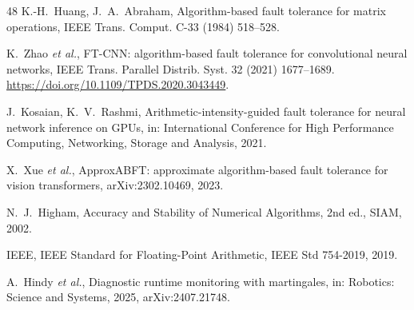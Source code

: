 \documentclass[preprint,12pt]{elsarticle}
\begin{document}
\begin{thebibliography}{48}
 K.-H.~Huang, J.~A.~Abraham, Algorithm-based fault tolerance for matrix operations, IEEE Trans. Comput. C-33 (1984) 518--528.

 K.~Zhao \textit{et al.}, FT-CNN: algorithm-based fault tolerance for convolutional neural networks, IEEE Trans. Parallel Distrib. Syst. 32 (2021) 1677--1689. \url{https://doi.org/10.1109/TPDS.2020.3043449}.

 J.~Kosaian, K.~V.~Rashmi, Arithmetic-intensity-guided fault tolerance for neural network inference on GPUs, in: International Conference for High Performance Computing, Networking, Storage and Analysis, 2021.

 X.~Xue \textit{et al.}, ApproxABFT: approximate algorithm-based fault tolerance for vision transformers, arXiv:2302.10469, 2023.

 N.~J.~Higham, Accuracy and Stability of Numerical Algorithms, 2nd ed., SIAM, 2002.

 IEEE, IEEE Standard for Floating-Point Arithmetic, IEEE Std 754-2019, 2019.

 A.~Hindy \textit{et al.}, Diagnostic runtime monitoring with martingales, in: Robotics: Science and Systems, 2025, arXiv:2407.21748.

\end{thebibliography}
\end{document}
